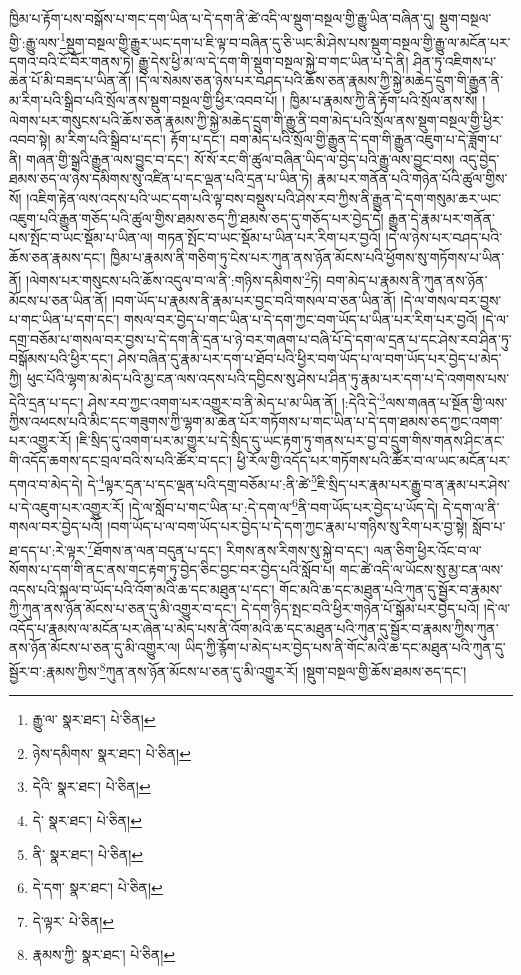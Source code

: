ཁྱིམ་པ་རྟོག་པས་བསྒོས་པ་གང་དག་ཡིན་པ་དེ་དག་ནི་ཚེ་འདི་ལ་སྡུག་བསྔལ་གྱི་རྒྱུ་ཡིན་བཞིན་དུ། སྡུག་བསྔལ་གྱི་:རྒྱུ་ལས་\footnote{རྒྱུ་ལ་  སྣར་ཐང་།  པེ་ཅིན། }སྡུག་བསྔལ་གྱི་རྒྱུར་ཡང་དག་པ་ཇི་ལྟ་བ་བཞིན་དུ་ཅི་ཡང་མི་ཤེས་པས་སྡུག་བསྔལ་གྱི་རྒྱུ་ལ་མངོན་པར་དགའ་བའི་ངོ་བོར་གནས་ཏེ། རྒྱུ་དེས་ཕྱི་མ་ལ་དེ་དག་གི་སྡུག་བསྔལ་སྐྱེ་བ་གང་ཡིན་པ་དེ་ནི། ཤིན་ཏུ་འཇིགས་པ་ཆེན་པོ་མི་བཟད་པ་ཡིན་ནོ། །དེ་ལ་སེམས་ཅན་ཉེས་པར་བཤད་པའི་ཆོས་ཅན་རྣམས་ཀྱི་སྐྱེ་མཆེད་དྲུག་གི་རྒྱུན་ནི་མ་རིག་པའི་སྒྲིབ་པའི་སྲོལ་ནས་སྡུག་བསྔལ་གྱི་ཕྱིར་འབབ་པོ། །
ཁྱིམ་པ་རྣམས་ཀྱི་ནི་རྟོག་པའི་སྲོལ་ནས་སོ། །ལེགས་པར་གསུངས་པའི་ཆོས་ཅན་རྣམས་ཀྱི་སྐྱེ་མཆེད་དྲུག་གི་རྒྱུ་ནི་བག་མེད་པའི་སྲོལ་ནས་སྡུག་བསྔལ་གྱི་ཕྱིར་འབབ་སྟེ། མ་རིག་པའི་སྒྲིབ་པ་དང་། རྟོག་པ་དང་། བག་མེད་པའི་སྲོལ་གྱི་རྒྱུན་དེ་དག་གི་རྒྱུན་འཇུག་པ་དེ་ཟློག་པ་ནི། གཞན་གྱི་སྒྲའི་རྒྱུན་ལས་བྱུང་བ་དང་། སོ་སོ་རང་གི་ཚུལ་བཞིན་ཡིད་ལ་བྱེད་པའི་རྒྱུ་ལས་བྱུང་བས། འདུ་བྱེད་ཐམས་ཅད་ལ་ཉེས་དམིགས་སུ་འཛིན་པ་དང་ལྡན་པའི་དྲན་པ་ཡིན་ཏེ། རྣམ་པར་གནོན་པའི་གཉེན་པོའི་ཚུལ་གྱིས་སོ། །འཇིག་རྟེན་ལས་འདས་པའི་ཡང་དག་པའི་ལྟ་བས་བསྡུས་པའི་ཤེས་རབ་ཀྱིས་ནི་རྒྱུན་དེ་དག་གསུམ་ཆར་ཡང་འཇུག་པའི་རྒྱུན་གཅོད་པའི་ཚུལ་གྱིས་ཐམས་ཅད་ཀྱི་ཐམས་ཅད་དུ་གཅོད་པར་བྱེད་དེ། རྒྱུན་དེ་རྣམ་པར་གནོན་པས་སྤོང་བ་ཡང་སྡོམ་པ་ཡིན་ལ། གཏན་སྤོང་བ་ཡང་སྡོམ་པ་ཡིན་པར་རིག་པར་བྱའོ། །དེ་ལ་ཉེས་པར་བཤད་པའི་ཆོས་ཅན་རྣམས་དང་། ཁྱིམ་པ་རྣམས་ནི་གཅིག་ཏུ་ངེས་པར་ཀུན་ནས་ཉོན་མོངས་པའི་ཕྱོགས་སུ་གཏོགས་པ་ཡིན་ནོ། །ལེགས་པར་གསུངས་པའི་ཆོས་འདུལ་བ་ལ་ནི་:གཉིས་དམིགས་\footnote{ཉེས་དམིགས་  སྣར་ཐང་།  པེ་ཅིན། }ཏེ། བག་མེད་པ་རྣམས་ནི་ཀུན་ནས་ཉོན་མོངས་པ་ཅན་ཡིན་ནོ། །བག་ཡོད་པ་རྣམས་ནི་རྣམ་པར་བྱང་བའི་གསལ་བ་ཅན་ཡིན་ནོ། །དེ་ལ་གསལ་བར་བྱས་པ་གང་ཡིན་པ་དག་དང་། གསལ་བར་བྱེད་པ་གང་ཡིན་པ་དེ་དག་ཀྱང་བག་ཡོད་པ་ཡིན་པར་རིག་པར་བྱའོ། །དེ་ལ་དགྲ་བཅོམ་པ་གསལ་བར་བྱས་པ་དེ་དག་ནི་དྲན་པ་ཉེ་བར་གཞག་པ་བཞི་པོ་དེ་དག་ལ་དྲན་པ་དང་ཤེས་རབ་ཤིན་ཏུ་བསྒོམས་པའི་ཕྱིར་དང་། ཤེས་བཞིན་དུ་རྣམ་པར་དག་པ་ཐོབ་པའི་ཕྱིར་བག་ཡོད་པ་ལ་བག་ཡོད་པར་བྱེད་པ་མེད་ཀྱི། ཕུང་པོའི་ལྷག་མ་མེད་པའི་མྱ་ངན་ལས་འདས་པའི་དབྱིངས་སུ་ཤེས་པ་ཤིན་ཏུ་རྣམ་པར་དག་པ་དེ་འགགས་པས་དེའི་དྲན་པ་དང་། ཤེས་རབ་ཀྱང་འགག་པར་འགྱུར་བ་ནི་མེད་པ་མ་ཡིན་ནོ། །:དེའི་དེ་\footnote{དེའི་  སྣར་ཐང་།  པེ་ཅིན། }ལས་གཞན་པ་སྔོན་གྱི་ལས་ཀྱིས་འཕངས་པའི་མིང་དང་གཟུགས་ཀྱི་ལྷག་མ་ཆེན་པོར་གཏོགས་པ་གང་ཡིན་པ་དེ་དག་ཐམས་ཅད་ཀྱང་འགག་པར་འགྱུར་རོ། །ཇི་སྲིད་དུ་འགག་པར་མ་གྱུར་པ་དེ་སྲིད་དུ་ཡང་རྟག་ཏུ་གནས་པར་བྱ་བ་དྲུག་གིས་གནས་ཤིང་ནང་གི་འདོད་ཆགས་དང་བྲལ་བའི་ས་པའི་ཚོར་བ་དང་། ཕྱི་རོལ་གྱི་འདོད་པར་གཏོགས་པའི་ཚོར་བ་ལ་ཡང་མངོན་པར་དགའ་བ་མེད་དེ། དེ་\footnote{དེ་  སྣར་ཐང་།  པེ་ཅིན། }ལྟར་དྲན་པ་དང་ལྡན་པའི་དགྲ་བཅོམ་པ་:ནི་ཚེ་\footnote{ནི་  སྣར་ཐང་།  པེ་ཅིན། }ཇི་སྲིད་པར་རྣམ་པར་རྒྱུ་བ་ན་རྣམ་པར་ཤེས་པ་དེ་འཇུག་པར་འགྱུར་རོ། །དེ་ལ་སློབ་པ་གང་ཡིན་པ་:དེ་དག་ལ་\footnote{དེ་དག་  སྣར་ཐང་།  པེ་ཅིན། }ནི་བག་ཡོད་པར་བྱེད་པ་ཡོད་དེ། དེ་དག་ལ་ནི་གསལ་བར་བྱེད་པའོ། །བག་ཡོད་པ་ལ་བག་ཡོད་པར་བྱེད་པ་དེ་དག་ཀྱང་རྣམ་པ་གཉིས་སུ་རིག་པར་བྱ་སྟེ། སློབ་པ་ཐ་དད་པ་:རེ་ལྟར་\footnote{དེ་ལྟར་  པེ་ཅིན། }ཐོགས་ན་ལན་བདུན་པ་དང་། རིགས་ནས་རིགས་སུ་སྐྱེ་བ་དང་། ལན་ཅིག་ཕྱིར་འོང་བ་ལ་སོགས་པ་དག་གི་ནང་ནས་གང་རྟག་ཏུ་བྱེད་ཅིང་བྱང་བར་བྱེད་པའི་སློབ་པ། གང་ཚེ་འདི་ལ་ཡོངས་སུ་མྱ་ངན་ལས་འདས་པའི་སྐལ་བ་ཡོད་པའི་འོག་མའི་ཆ་དང་མཐུན་པ་དང་། གོང་མའི་ཆ་དང་མཐུན་པའི་ཀུན་དུ་སྦྱོར་བ་རྣམས་ཀྱི་ཀུན་ནས་ཉོན་མོངས་པ་ཅན་དུ་མི་འགྱུར་བ་དང་། དེ་དག་ཉིད་སྤང་བའི་ཕྱིར་གཉེན་པོ་སྒོམ་པར་བྱེད་པའོ། །དེ་ལ་འདོད་པ་རྣམས་ལ་མངོན་པར་ཞེན་པ་མེད་པས་ནི་འོག་མའི་ཆ་དང་མཐུན་པའི་ཀུན་དུ་སྦྱོར་བ་རྣམས་ཀྱིས་ཀུན་ནས་ཉོན་མོངས་པ་ཅན་དུ་མི་འགྱུར་ལ། ཡིད་ཀྱི་རྙོག་པ་མེད་པར་བྱེད་པས་ནི་གོང་མའི་ཆ་དང་མཐུན་པའི་ཀུན་དུ་སྦྱོར་བ་:རྣམས་ཀྱིས་\footnote{རྣམས་ཀྱི་  སྣར་ཐང་།  པེ་ཅིན། }ཀུན་ནས་ཉོན་མོངས་པ་ཅན་དུ་མི་འགྱུར་རོ། །སྡུག་བསྔལ་གྱི་ཆོས་ཐམས་ཅད་དང་། 